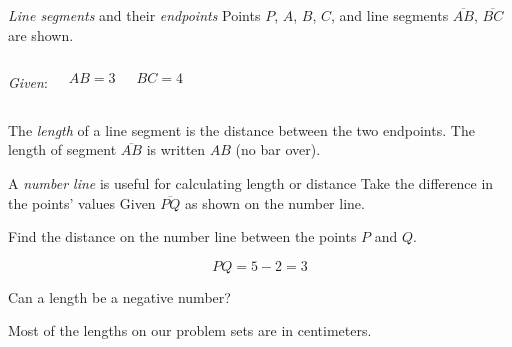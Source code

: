 \begin{frame}{\emph{Line segments} and their \emph{endpoints}}
  Points $P$, $A$, $B$, $C$, and line segments $\overline{AB}$, $\overline{BC}$ are shown. \vspace{1cm}
    \begin{columns}
        \emph{Given}:\par $AB=3$ \par $BC=4$
    \end{columns} \vspace{1cm}
    The \emph{length} of a line segment is the distance between the two endpoints. The length of segment $\overline{AB}$ is written $AB$ (no bar over).
\end{frame}

\begin{frame}{A \emph{number line} is useful for calculating length or distance}
  {Take the difference in the points' values}
  Given $\overline{PQ}$ as shown on the number line.
    \begin{center}
    \end{center}
    Find the distance on the number line between the points $P$ and $Q$. \par  \bigskip %
     $$PQ = 5-2 =3$$ \par \bigskip
    Can a length be a negative number? \par \vspace{1cm}
    Most of the lengths on our problem sets are in centimeters.
\end{frame}

